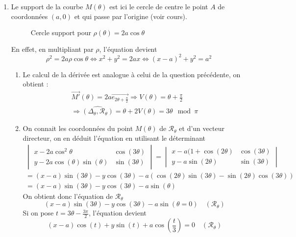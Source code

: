 \begin{enumerate}
\item Le support de la courbe $M(\theta)$ est ici le cercle de centre le point $A$ de coordonnées $(a,0)$ et qui passe par l'origine (voir cours).
\begin{figure}
   \centering
   
   \caption{Cercle support pour $\rho(\theta)=2a\cos \theta$}
   \label{fig:Ccaustic_3}
\end{figure}
En effet, en multipliant par $\rho$, l'équation devient 
\begin{displaymath}
 \rho^2 = 2a\rho \cos \theta 
\Leftrightarrow
x^2+y^2 = 2ax
\Leftrightarrow
(x-a)^2+y^2=a^2
\end{displaymath}
\begin{enumerate}
  \item Le calcul de la dérivée est analogue à celui de la question précédente, on obtient :
\begin{multline*}
 \overrightarrow{M'}(\theta) = 2a\overrightarrow{e_{2\theta + \frac{\pi}{2}}}
\Rightarrow
V(\theta)=\theta+\frac{\pi}{2}\\
\Rightarrow
\widehat{(\Delta_\theta,\mathcal{R}_\theta)} = \theta + 2V(\theta) = 3\theta \mod \pi
\end{multline*}
  \item On connait les coordonnées du point $M(\theta)$ de $\mathcal{R}_{\theta}$ et d'un vecteur directeur, on en déduit l'équation en utilisant le déterminant
\begin{multline*}
 \begin{vmatrix}
  x - 2a\cos^2\theta & \cos(3\theta)\\
  y -2a\cos(\theta)\sin(\theta) & \sin(3\theta)
 \end{vmatrix}=
 \begin{vmatrix}
  x - a(1+\cos(2\theta) & \cos(3\theta)\\
  y -a\sin(2\theta) & \sin(3\theta)
 \end{vmatrix}\\
=(x-a)\sin(3\theta)-y\cos(3\theta)
-a\left( \cos(2\theta)\sin(3\theta)-\sin(2\theta)\cos(3\theta)\right) \\
= (x-a)\sin(3\theta)-y\cos(3\theta) -a\sin(\theta)
\end{multline*}
On obtient donc l'équation de $\mathcal{R}_\theta$
\begin{displaymath}
(x-a)\sin(3\theta) -y\cos(3\theta)  - a\sin(\theta=0) \quad (\mathcal{R}_{\theta}) 
\end{displaymath}
Si on pose $t=3\theta - \frac{3\pi}{2}$, l'équation devient
\begin{displaymath}
(x-a)\cos(t)  +  y\sin(t) + a\cos(\frac{t}{3})=0 \quad (\mathcal R _\theta) 
\end{displaymath}
\end{enumerate}


\end{enumerate}
